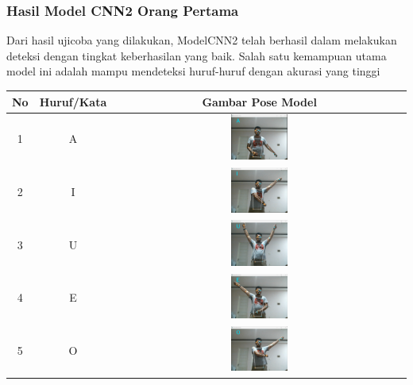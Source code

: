 \subsubsection*{Hasil Model CNN2 Orang Pertama}

Dari hasil ujicoba yang dilakukan, ModelCNN2 telah berhasil dalam melakukan deteksi dengan tingkat keberhasilan yang baik. Salah satu kemampuan utama model ini adalah mampu mendeteksi huruf-huruf dengan akurasi yang tinggi

\begin{table}[h]
		\centering
		\label{tbl:Tabel Contoh Huruf/Kata dan Gambar Pose Model CNN2 Orang Pertama}
		\begin{tabular}{|c|c|c|}
		\hline
		No & Huruf/Kata & Gambar Pose Model  \\
		\hline
		1 & A & \includegraphics[width=0.2\textwidth]{gambar/bener/HurufA_ModelCNN2_Dawe.png} \\
		\hline
		2 & I & \includegraphics[width=0.2\textwidth]{gambar/bener/HurufI_ModelCNN2_Dawe.png} \\
		\hline
		3 & U & \includegraphics[width=0.2\textwidth]{gambar/bener/HurufU_ModelCNN2_Dawe.png} \\
		\hline
		4 & E & \includegraphics[width=0.2\textwidth]{gambar/bener/HurufE_ModelCNN2_Dawe.png} \\
		\hline
		5 & O & \includegraphics[width=0.2\textwidth]{gambar/bener/HurufO_ModelCNN2_Dawe.png} \\

\end{tabular}
\end{table}
